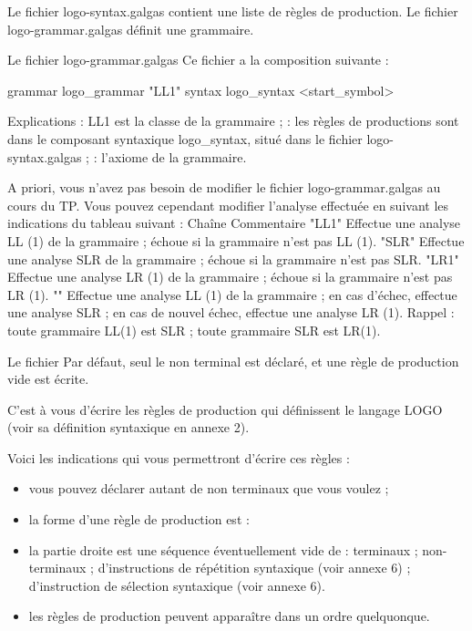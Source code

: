 Le fichier logo-syntax.galgas contient une liste de règles de production. Le fichier logo-grammar.galgas définit une grammaire.

Le fichier logo-grammar.galgas
Ce fichier a la composition suivante :

\begin{galgascode}
grammar logo_grammar "LL1" {
  syntax logo_syntax
  <start_symbol>
}
\end{galgascode}

Explications :
LL1 est la classe de la grammaire ;
 : les règles de productions sont dans le composant syntaxique logo\_syntax, situé dans le fichier logo-syntax.galgas ; 
 : l'axiome de la grammaire.

A priori, vous n'avez pas besoin de modifier le fichier logo-grammar.galgas au cours du TP. Vous pouvez cependant modifier l'analyse effectuée en suivant les indications du tableau suivant :
Chaîne	Commentaire
"LL1"	Effectue une analyse LL (1) de la grammaire ; échoue si la grammaire n'est pas LL (1).
"SLR"	Effectue une analyse SLR de la grammaire ; échoue si la grammaire n'est pas SLR.
"LR1"	Effectue une analyse LR (1) de la grammaire ; échoue si la grammaire n'est pas LR (1).
""	Effectue une analyse LL (1) de la grammaire ; en cas d'échec, effectue une analyse SLR ; en cas de nouvel échec, effectue une analyse LR (1). 
Rappel :
toute grammaire LL(1) est SLR ;
toute grammaire SLR est LR(1).

Le fichier 
Par défaut, seul le non terminal  est déclaré, et une règle de production vide est écrite.

C'est à vous d'écrire les règles de production qui définissent le langage LOGO (voir sa définition syntaxique en annexe 2).

Voici les indications qui vous permettront d'écrire ces règles :
\begin{itemize}
  \item vous pouvez déclarer autant de non terminaux que vous voulez ;
  \item la forme d'une règle de production est :
  \item la partie droite est une séquence éventuellement vide de :
	terminaux ;
	non-terminaux ;
	d'instructions de répétition syntaxique (voir annexe 6) ;
	d'instruction de sélection syntaxique (voir annexe 6).
  \item les règles de production peuvent apparaître dans un ordre quelquonque.
\end{itemize}

